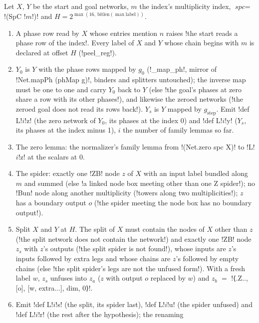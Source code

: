 {\begin{algorithm}\label{alg:lean-export-net-linked}
Let $X$, $Y$ be the start and goal networks, $m$ the index's multiplicity index,
$\textit{spc} = $ \code!(SpC !$m$\code!)! and $H = 2^{\max(16,\ \mathrm{bitlen}(\max \text{label}))}$.
\begin{enumerate}
\item A phase row read by $X$ whose entries mention $n$ raises
  \code!the start reads a phase row of the index!. Every label of $X$ and $Y$ whose chain begins
  with $m$ is declared at offset $H$ (\py!peel_reg!).
\item $Y_0$ is $Y$ with the phase rows mapped by $g_0$ (\py!_map_ph!, mirror of
  \lean!Net.mapPh (phMap g)!, binders and splitters untouched); the inverse map must be one to
  one and carry $Y_0$ back to $Y$ (else
  \code!the goal's phases at zero share a row with its other phases!), and likewise the zeroed
  networks (\code!the zeroed goal does not read its rows back!). $Y_s$ is $Y$ mapped by
  $g_{\mathrm{step}}$. Emit \code!def L!$i$\code!z! (the zero network of $Y_0$, its phases at the
  index 0) and \code!def L!$i$\code!y! ($Y_s$, its phases at the index minus 1), $i$ the number
  of family lemmas so far.
\item The zero lemma: the normalizer's family lemma from \code!(Net.zero spc X)! to
  \code!L!$i$\code!z! at the scalars at 0.
\item The spider: exactly one \code!ZB! node $z$ of $X$ with an input label bundled along $m$
  and summed (else \code!a linked node box meeting other than one Z spider!); no \code!Bun!
  node along another multiplicity (\code!towers along two multiplicities!); $z$ has a boundary
  output $o$ (\code!the spider meeting the node box has no boundary output!).
\item Split $X$ and $Y$ at $H$. The split of $X$ must contain the nodes of $X$ other than $z$
  (\code!the split network does not contain the network!) and exactly one \code!ZB! node $z_s$
  with $z$'s outputs (\code!the split spider is not found!), whose inputs are $z$'s inputs
  followed by extra legs and whose chains are $z$'s followed by empty chains (else
  \code!the split spider's legs are not the unfused form!). With a fresh label $w$, $z_s$ unfuses
  into $z_a$ ($z$ with output $o$ replaced by $w$) and $z_b$ $=$ \code!⟨.Z.., [o], [w, extra...], dim, 0⟩!.
\item Emit \code!def L!$i$\code!s! (the split, its spider last), \code!def L!$i$\code!u! (the
  spider unfused) and \code!def L!$i$\code!r! (the rest after the hypothesis); the renaming

\end{enumerate}
\end{algorithm}}
